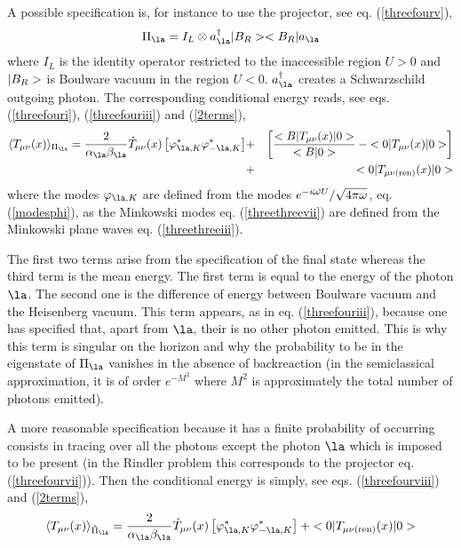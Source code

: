 A possible specification is,
for instance to use the projector, see eq. (\ref{threefourv}),
\begin{equation}
\Pi_{\la} =  I_{L} \otimes
a^\dagger_{\la}  \ket{B_R}\bra{B_{R}} a_{\la}
 \label{threefourva} \end{equation}
where $I_{{L }}$ is the identity operator restricted to the
inaccessible region $U>0$
and $\mbox{$ \vert B_R > $}$ is Boulware vacuum in the region $U<0$.
$a^\dagger_\la$ creates a Schwarzschild outgoing photon.
The corresponding conditional energy
reads, see eqs. (\ref{threefouri}), (\ref{threefouriii}) and (\ref{2terms}),
\begin{eqnarray}
\langle T_{\mu \nu} (x) \rangle_{\Pi_{\la}} =
{2 \over \alpha_\la \beta_\la } \hat T_{\mu \nu }(x)
\left[ \varphi^*_{\la,K} \varphi^*_{-\la,K} \right]
 &+& \left[ {
\expect{B} {T_{\mu \nu } (x)} {0} \over  \scal{B}{0}}
- \expect{0}{T_{\mu \nu} (x)}{0} \right]
\nonumber
\\
&+&\expect{0}{T_{\mu \nu
({\rm ren})} (x)}{0}
\label{bh18}
\end{eqnarray}
where the modes $\varphi_{\la,K}$ are defined from the
modes $e^{-i\mbox{$ \omega $} U}/\sqrt{4 \pi \mbox{$ \omega $}}$, eq. (\ref{modesphi}), as the Minkowski
modes
eq. (\ref{threethreevii}) are defined from the Minkowski plane waves
eq. (\ref{threethreeiii}).

The first two terms arise from the specification of the final state whereas the
third
term is the mean energy.
The first term is equal to the energy of the photon $\la$. The second
one is
the difference of energy between Boulware vacuum and the
Heisenberg vacuum.
This term appears,
as in eq. (\ref{threefouriii}),
because one has specified that, apart from $\la$, their is no other photon
emitted. This is why this term is singular on the horizon
and why
the probability to be in the eigenstate of $\Pi_{\la}$
 vanishes in the absence of backreaction
(in the semiclassical approximation, it is of  order
 $e^{-M^2}$ where $M^2$ is approximately
the total number of photons emitted).

A more reasonable specification because it has a finite probability
of occurring consists in tracing over all the photons
except the photon $\la$ which is imposed to be present (in the Rindler
problem this corresponds to the projector eq. (\ref{threefourvii})).
 Then the conditional energy is
simply, see eqs. (\ref{threefourviii}) and (\ref{2terms}),
\begin{equation}
\langle T_{\mu \nu }(x)\rangle _{\tilde \Pi_\la} =
{2 \over \alpha_\la \beta_\la } \hat T_{\mu
\nu } (x)
\left[ \varphi^*_{\la,K} \varphi^*_{-\la,K} \right]+ \expect{0}{T_{\mu
\nu
({\rm ren})} (x)}{0}
\label{bh19}
\end{equation}

